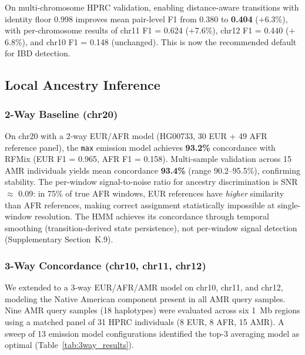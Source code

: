 On multi-chromosome HPRC validation, enabling distance-aware transitions with identity floor 0.998 improves mean pair-level F1 from 0.380 to \textbf{0.404} ($+$6.3\%), with per-chromosome results of chr11 F1 = 0.624 ($+$7.6\%), chr12 F1 = 0.440 ($+$6.8\%), and chr10 F1 = 0.148 (unchanged). This is now the recommended default for IBD detection.

\subsection{Local Ancestry Inference}
\label{sec:results_ancestry_validation}

\subsubsection{2-Way Baseline (chr20)}

On chr20 with a 2-way EUR/AFR model (HG00733, 30 EUR + 49 AFR reference panel), the \texttt{max} emission model achieves \textbf{93.2\%} concordance with RFMix (EUR F1 = 0.965, AFR F1 = 0.158). Multi-sample validation across 15 AMR individuals yields mean concordance \textbf{93.4\%} (range 90.2--95.5\%), confirming stability. The per-window signal-to-noise ratio for ancestry discrimination is SNR $\approx$ 0.09: in 75\% of true AFR windows, EUR references have \emph{higher} similarity than AFR references, making correct assignment statistically impossible at single-window resolution. The HMM achieves its concordance through temporal smoothing (transition-derived state persistence), not per-window signal detection (Supplementary Section~K.9).

\subsubsection{3-Way Concordance (chr10, chr11, chr12)}
\label{sec:3way_ancestry}

We extended to a 3-way EUR/AFR/AMR model on chr10, chr11, and chr12, modeling the Native American component present in all AMR query samples. Nine AMR query samples (18 haplotypes) were evaluated across six 1~Mb regions using a matched panel of 31 HPRC individuals (8 EUR, 8 AFR, 15 AMR). A sweep of 13 emission model configurations identified the top-3 averaging model as optimal (Table~\ref{tab:3way_results}).

